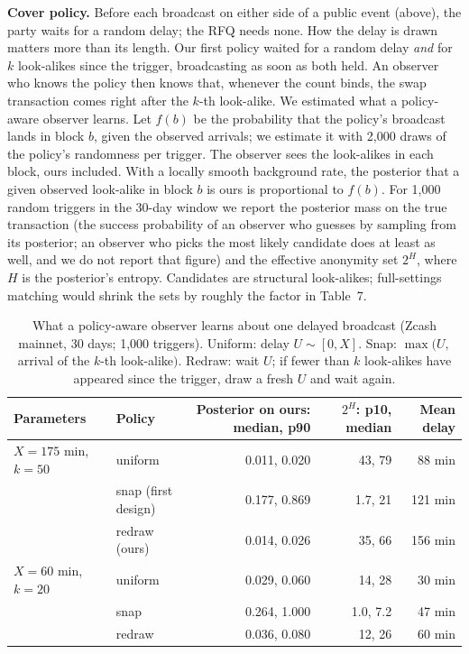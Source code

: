 \documentclass[10pt,letterpaper]{article}
\theoremstyle{plain}
\theoremstyle{definition}
\begin{document}
\textbf{Cover policy.} Before each broadcast on either side of a public event (above), the party
waits for a random delay; the RFQ needs none. How the delay is drawn matters more than its length.
Our first policy waited for a random delay \emph{and} for $k$ look-alikes since the trigger,
broadcasting as soon as both held. An observer who knows the policy then knows that, whenever the
count binds, the swap transaction comes right after the $k$-th look-alike. We estimated what a
policy-aware observer learns. Let $f(b)$ be the probability that the policy's broadcast lands in
block $b$, given the observed arrivals; we estimate it with 2{,}000 draws of the policy's
randomness per trigger. The observer sees the look-alikes in each block, ours included. With a
locally smooth background rate, the posterior that a given observed look-alike in block $b$ is
ours is proportional to $f(b)$. For 1{,}000 random triggers in the 30-day window we report the
posterior mass on the true transaction (the success probability of an observer who guesses by
sampling from its posterior; an observer who picks the most likely candidate does at least as
well, and we do not report that figure) and the effective anonymity set $2^H$, where $H$ is the posterior's
entropy. Candidates are structural look-alikes; full-settings matching would shrink the sets by
roughly the factor in Table~7.

\begin{table}[H]
\centering\small
\begin{tabular}{@{}llrrr@{}}
\toprule
\textbf{Parameters} & \textbf{Policy} & \textbf{Posterior on ours: median, p90} & \textbf{$2^H$: p10, median} & \textbf{Mean delay}\\
\midrule
$X=175$ min, $k=50$ & uniform & 0.011, 0.020 & 43, 79 & 88 min\\
 & snap (first design) & 0.177, 0.869 & 1.7, 21 & 121 min\\
 & redraw (ours) & 0.014, 0.026 & 35, 66 & 156 min\\
\midrule
$X=60$ min, $k=20$ & uniform & 0.029, 0.060 & 14, 28 & 30 min\\
 & snap & 0.264, 1.000 & 1.0, 7.2 & 47 min\\
 & redraw & 0.036, 0.080 & 12, 26 & 60 min\\
\bottomrule
\end{tabular}
\caption{What a policy-aware observer learns about one delayed broadcast (Zcash mainnet, 30 days;
1{,}000 triggers). Uniform: delay $U \sim [0,X]$. Snap: $\max(U, $ arrival of the $k$-th
look-alike$)$. Redraw: wait $U$; if fewer than $k$ look-alikes have appeared since the trigger,
draw a fresh $U$ and wait again.}
\label{tab:cover}
\end{table}
\end{document}
